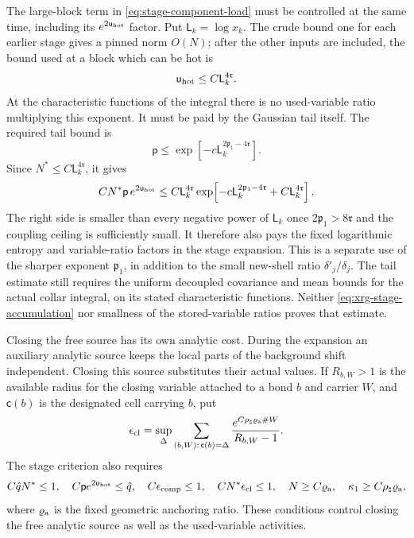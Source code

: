 \documentclass[11pt,letterpaper,reqno]{amsart}
\theoremstyle{definition}
\theoremstyle{remark}
\begin{document}
The large-block term in
\eqref{eq:stage-component-load} must be controlled
at the same time, including its
\(e^{2\mathsf u_{\rm hot}}\) factor. Put
\(\mathsf L_k=\log x_k\). The crude bound one for each
earlier stage gives a pinned norm \(O(N)\); after the other
inputs are included, the bound used at a block which can be hot is
\[
 \mathsf u_{\rm hot}\le C\mathsf L_k^{4\mathfrak r}.
\]
At the characteristic functions of the integral there is no
used-variable ratio multiplying this exponent. It must be paid
by the Gaussian tail itself. The required tail bound is
\[
 \mathsf p\le
 \exp\!\left[-c\mathsf L_k^{2\mathfrak p_1-4\mathfrak r}\right].
\]
Since \(N^*\le C\mathsf L_k^{4\mathfrak r}\), it gives
\begin{equation}\label{eq:stage-hot-tail-budget}
 CN^*\mathsf p\,e^{2\mathsf u_{\rm hot}}
 \le C\mathsf L_k^{4\mathfrak r}
 \exp\!\left[-c\mathsf L_k^{2\mathfrak p_1-4\mathfrak r}
                         +C\mathsf L_k^{4\mathfrak r}\right].
\end{equation}
The right side is smaller than every negative power of
\(\mathsf L_k\) once \(2\mathfrak p_1>8\mathfrak r\) and the
coupling ceiling is sufficiently small. It therefore also pays
the fixed logarithmic entropy and variable-ratio factors in the
stage expansion. This is a separate use of the sharper exponent
\(\mathfrak p_1\), in addition to the small new-shell ratio
\(\delta'_j/\delta_j\). The tail estimate still requires the
uniform decoupled covariance and mean bounds for the actual
collar integral, on its stated characteristic functions.
Neither \eqref{eq:xrg-stage-accumulation} nor smallness of the
stored-variable ratios proves that estimate.


Closing the free source has its own analytic cost.
During the expansion an auxiliary analytic source keeps
the local parts of the background shift independent.
Closing this source substitutes their actual values.
If \(R_{b,W}>1\) is the available radius for the
closing variable attached to a bond \(b\) and
carrier \(W\), and \(\mathsf c(b)\) is the designated
cell carrying \(b\), put
\[
 \epsilon_{\rm cl}=
 \sup_\Delta\sum_{(b,W):\,\mathsf c(b)=\Delta}
       \frac{e^{C\rho_\natural\varrho_{\rm a}\#W}}{R_{b,W}-1}.
\]
The stage criterion also requires
\[
 C\hat qN^*\le1,\quad
 C\mathsf p e^{2\mathsf u_{\rm hot}}\le\hat q,\quad
 C\epsilon_{\rm comp}\le1,\quad
 CN^*\epsilon_{\rm cl}\le1,\quad
 N\ge C\varrho_{\rm a},\quad
 \kappa_1\ge C\rho_\natural\varrho_{\rm a},
\]
where \(\varrho_{\rm a}\) is the fixed geometric
anchoring ratio. These conditions control closing
the free analytic source as well as the
used-variable activities.
\end{document}
